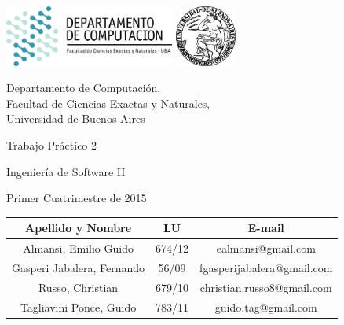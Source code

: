 \documentclass[a4paper, 10pt, twoside]{article}
\newcommand{\titulo}{Trabajo Práctico 2}
\newcommand{\materia}{Ingeniería de Software II}
\newcommand{\cuatrimestre}{Primer Cuatrimestre de 2015}
\begin{document}


\thispagestyle{caratula}

\begin{center}

\includegraphics[height=2cm]{DC.png} 
\hfill
\includegraphics[height=2cm]{UBA.jpg} 

\vspace{2cm}

Departamento de Computación,\\
Facultad de Ciencias Exactas y Naturales,\\
Universidad de Buenos Aires

\vspace{4cm}

\begin{Huge}
\titulo
\end{Huge}

\vspace{0.5cm}

\begin{Large}
\materia
\end{Large}

\vspace{1cm}

\cuatrimestre

\vspace{4cm}

\begin{tabular}{|c|c|c|}
\hline
Apellido y Nombre & LU & E-mail\\
\hline
Almansi, Emilio Guido         & 674/12 & ealmansi@gmail.com\\
Gasperi Jabalera, Fernando    & 56/09  & fgasperijabalera@gmail.com\\
Russo, Christian              & 679/10 & christian.russo8@gmail.com\\
Tagliavini Ponce, Guido       & 783/11 & guido.tag@gmail.com\\
\hline
\end{tabular}

\end{center}
\end{document}
